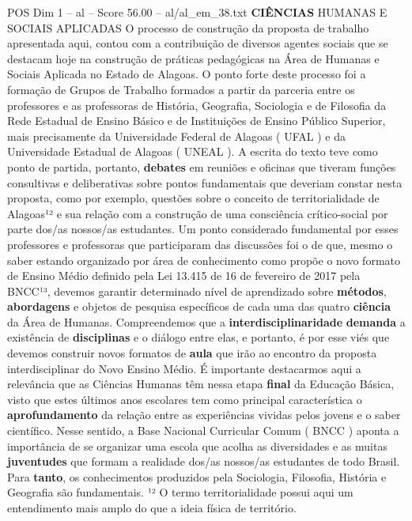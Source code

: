 \begin{textsample}{POS Dim 1 – al – Score 56.00 – al/al\_em\_38.txt}  \label{ex:f1_pos_152}
\textbf{CIÊNCIAS} HUMANAS E SOCIAIS APLICADAS O processo de construção da proposta de trabalho apresentada aqui, contou com a contribuição de diversos agentes sociais que se destacam hoje na construção de práticas pedagógicas na Área de Humanas e Sociais Aplicada no Estado de Alagoas.
O ponto forte deste processo foi a formação de Grupos de Trabalho formados a partir da parceria entre os professores e as professoras de História, Geografia, Sociologia e de Filosofia da Rede Estadual de Ensino Básico e de Instituições de Ensino Público Superior, mais precisamente da Universidade Federal de Alagoas ( UFAL ) e da Universidade Estadual de Alagoas ( UNEAL ).
A escrita do texto teve como ponto de partida, portanto, \textbf{debates} em reuniões e oficinas que tiveram funções consultivas e deliberativas sobre pontos fundamentais que deveriam constar nesta proposta, como por exemplo, questões sobre o conceito de territorialidade de Alagoas¹² e sua relação com a construção de uma consciência crítico-social por parte dos/as nossos/as estudantes.
Um ponto considerado fundamental por esses professores e professoras que participaram das discussões foi o de que, mesmo o saber estando organizado por área de conhecimento como propõe o novo formato de Ensino Médio definido pela Lei 13.415 de 16 de fevereiro de 2017 pela BNCC¹³, devemos garantir determinado nível de aprendizado sobre \textbf{métodos}, \textbf{abordagens} e objetos de pesquisa específicos de cada uma das quatro \textbf{ciência} da Área de Humanas.
Compreendemos que a \textbf{interdisciplinaridade} \textbf{demanda} a existência de \textbf{disciplinas} e o diálogo entre elas, e portanto, é por esse viés que devemos construir novos formatos de \textbf{aula} que irão ao encontro da proposta interdisciplinar do Novo Ensino Médio.
É importante destacarmos aqui a relevância que as Ciências Humanas têm nessa etapa \textbf{final} da Educação Básica, visto que estes últimos anos escolares tem como principal característica o \textbf{aprofundamento} da relação entre as experiências vividas pelos jovens e o saber científico.
Nesse sentido, a Base Nacional Curricular Comum ( BNCC ) aponta a importância de se organizar uma escola que acolha as diversidades e as muitas \textbf{juventudes} que formam a realidade dos/as nossos/as estudantes de todo Brasil.
Para \textbf{tanto}, os conhecimentos produzidos pela Sociologia, Filosofia, História e Geografia são fundamentais. ¹² O termo territorialidade possui aqui um entendimento mais amplo do que a ideia física de território.

\end{textsample}
